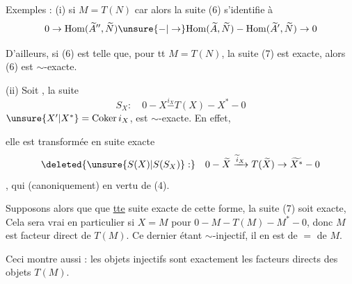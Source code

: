 Exemples : (i) si  $\boxed{M=T(N)}$ car alors la suite (6) s'identifie à 
\[
0\to\mathrm{Hom}(\widetilde A'',\widetilde N)\unsure{-|\to}\mathrm{Hom}(\widetilde A,\widetilde N)-\mathrm{Hom}(\widetilde A',\widetilde N)\to0
\]

D'ailleurs, si (6) est telle que, pour tt $M=T(N)$, la suite (7) est exacte, alors (6) est $\sim$-exacte.




(ii) Soit  , la suite 
\[
\boxed{S_X:\quad0-X\overset{i_X}{-}T(X)-X^*-0}\tag*{(9)}
\]
 $\unsure{X'|X^*}=\mathrm{Coker}\,i_X$, est $\sim$-exacte. En effet,

elle est transformée en  suite exacte
\[
\deleted{\unsure{S(X)|S(S_X)}:}\quad 0-\widetilde X\xrightarrow{\widetilde i_X}T(\widetilde X)\to\widetilde {X^*}-0
\]
, qui   (canoniquement) en vertu de (4).

Supposons alors que  que \uline{tte}  suite exacte de cette forme, la suite (7) soit exacte,  Cela sera vrai en particulier si  $X=M$ pour $0-M-T(M)-M^*-0$, donc $M$ est facteur direct de $T(M)$. Ce dernier étant $\sim$-injectif, il en est  de $=$ de $M$.

Ceci montre aussi : les objets injectifs sont exactement les facteurs directs des objets $T(M)$.

